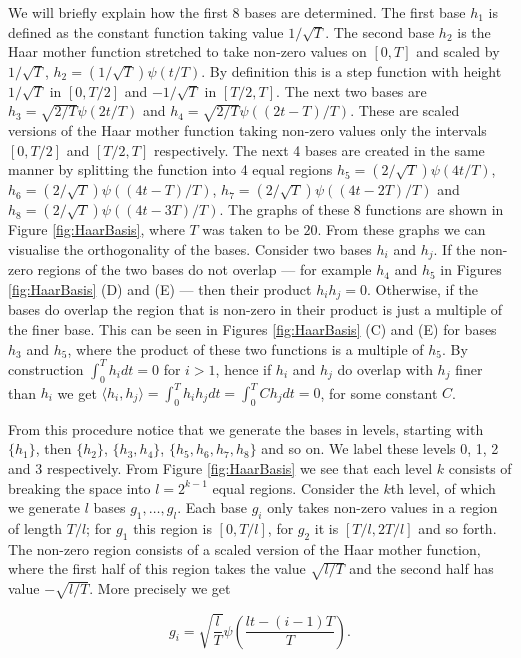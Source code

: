 \documentclass[12pt]{book} %
\begin{document}
 We will briefly explain how the first 8 bases are determined.  The first base $h_1$ is defined as the constant function taking value $1/ \sqrt T$. The second base $h_2$ is the Haar mother function stretched to take non-zero values on $[0,T]$ and scaled by $1/ \sqrt T$, $h_2 = (1/ \sqrt T)\psi(t/T)$. By definition this is a step function with  height $1/ \sqrt T$ in $[0,T/2]$ and $-1/ \sqrt T$ in $[T/2,T]$. The next two bases are $h_3 = \sqrt{2/T}\psi(2t/T)$ and $h_4 = \sqrt{2/T}\psi((2t-T)/T)$. These are scaled versions of the Haar mother function taking non-zero values only the intervals $[0,T/2]$ and $[T/2,T]$ respectively. The next 4 bases are created in the same manner by splitting the function into 4 equal regions $h_5 = (2/ \sqrt T)\psi(4t/T)$, $h_6 = (2/ \sqrt T)\psi((4t-T)/T)$, $h_7 = (2/ \sqrt T)\psi((4t-2T)/T)$ and $h_8 = (2/ \sqrt T)\psi((4t-3T)/T)$. The graphs of these 8 functions are shown in Figure \ref{fig:HaarBasis}, where $T$ was taken to be $20$. From these graphs we can visualise the orthogonality of the bases. Consider two bases $h_i$ and $h_j$. If the non-zero regions of the two bases do not overlap --- for example $h_4$ and $h_5$ in Figures \ref{fig:HaarBasis} (D) and (E) --- then their product $h_ih_j = 0$. Otherwise, if the bases do overlap the region that is non-zero in their product is just a multiple of the finer base. This can be seen in Figures \ref{fig:HaarBasis} (C) and (E) for bases $h_3$ and $h_5$, where the product of these two functions is a multiple of $h_5$. By construction $\int^T_0 h_i dt = 0$ for $i>1$, hence if $h_i$ and $h_j$ do overlap with $h_j$ finer than $h_i$ we get $\langle h_i,h_j \rangle = \int^T_0 h_i h_j dt = \int^T_0 C h_j dt = 0$, for some constant $C$.
 
    From this procedure notice that we generate the bases in levels, starting with $\{h_1\}$, then $\{h_2\}$, $\{h_3,h_4\}$, $\{h_5,h_6,h_7,h_8\}$ and so on. We label these levels 0, 1, 2 and 3 respectively. From Figure \ref{fig:HaarBasis} we see that each level $k$ consists of breaking the space into $l = 2^{k-1}$ equal regions. Consider the $k$th level, of which we generate $l$ bases $g_{1}, \dots, g_{l}$. Each base $g_i$ only takes non-zero values in a region of length $T/l$; for $g_1$ this region is $[0,T/l]$, for $g_2$ it is $[T/l,2T/l]$ and so forth. The non-zero region consists of a scaled version of the Haar mother function, where the first half of this region takes the value $\sqrt{l/ T}$ and the second half has value $-\sqrt{l/ T}$. More precisely we get 

$$g_{i} = \sqrt{\frac{l}{ T}}\psi \left( \frac{lt-(i-1)T}{T} \right).$$
\end{document}
